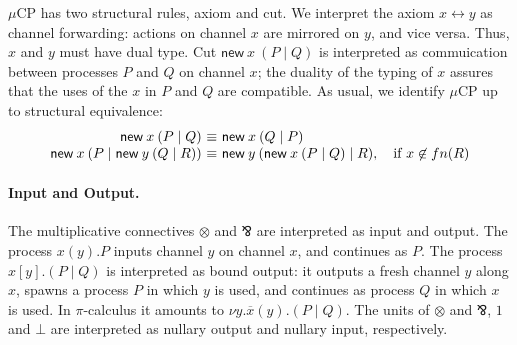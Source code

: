 \documentclass[orivec,envcountsame]{llncs}
\makeatletter
\newcommand{\parr}{\mathbin\bindnasrepma}
\newcommand{\cpdual}[1]{#1^\perp}
\newcommand{\mkwd}[1]{\mathsf{#1}}
\newcommand{\link}[2]{#1 \leftrightarrow #2}
\newcommand{\cut}[4]{\mkwd{new}\:#1 \: (#3 \mid #4)}
\newcommand{\mucp}{$\mu\mathrm{CP}$\xspace}
\newcommand{\ba}{\begin{array}}
\newcommand{\ea}{\end{array}}
\newenvironment{equations}{\[\ba{@{}r@{~}c@{~}l@{}}}{\ea\]}
\makeatother
\begin{document}
\mucp has two structural rules, axiom and cut.  We interpret the axiom $\link{x}{y}$ as channel
forwarding: actions on channel $x$ are mirrored on $y$, and vice versa.  Thus, $x$ and $y$ must have
dual type.  Cut $\cut{x}{A}{P}{Q}$ is interpreted as commuication between processes $P$ and $Q$ on
channel $x$; the duality of the typing of $x$ assures that the uses of the $x$ in $P$ and $Q$ are
compatible. As usual, we identify \mucp up to structural equivalence:
\begin{equations}
\small
  \cut{x}{A}{P}{Q} &\equiv& \cut{x}{\cpdual{A}}{Q}{P} \\
  \cut{x}{A}{P}{\cut{y}{B}{Q}{R}} &\equiv& \cut{y}{B}{\cut{x}{A}{P}{Q}}{R}, \quad \text{if $x \not\in fn(R)$} \\
\end{equations}%


\paragraph{Input and Output.}

The multiplicative connectives $\otimes$ and $\parr$ are interpreted as input and output. The
process $x(y).P$ inputs channel $y$ on channel $x$, and continues as $P$. The process $x[y].(P \mid
Q)$ is interpreted as bound output: it outputs a fresh channel $y$ along $x$, spawns a process $P$
in which $y$ is used, and continues as process $Q$ in which $x$ is used. In $\pi$-calculus it
amounts to $\nu y.\overline{x}(y).(P \mid Q)$. The units of $\otimes$ and $\parr$, $1$ and $\bot$
are interpreted as nullary output and nullary input, respectively.
\end{document}
